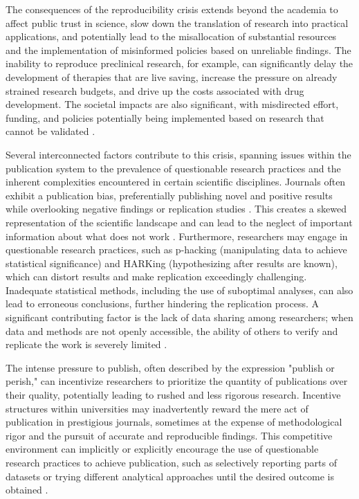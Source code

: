 \documentclass{article}
\begin{document}
The consequences of the reproducibility crisis extends beyond the academia to affect public trust in science, slow down the translation of research into practical applications, and potentially lead to the misallocation of substantial resources and the implementation of misinformed policies based on unreliable findings. The inability to reproduce preclinical research, for example, can significantly delay the development of therapies that are live saving, increase the pressure on already strained research budgets, and drive up the costs associated with drug development. The societal impacts are also significant, with misdirected effort, funding, and policies potentially being implemented based on research that cannot be validated \cite{freedman2015economics}.

Several interconnected factors contribute to this crisis, spanning issues within the publication system to the prevalence of questionable research practices and the inherent complexities encountered in certain scientific disciplines. Journals often exhibit a publication bias, preferentially publishing novel and positive results while overlooking negative findings or replication studies \cite{ioannidis2005most}. This creates a skewed representation of the scientific landscape and can lead to the neglect of important information about what does not work \cite{collins_policy_2014}. Furthermore, researchers may engage in questionable research practices, such as p-hacking (manipulating data to achieve statistical significance) and HARKing (hypothesizing after results are known), which can distort results and make replication exceedingly challenging. Inadequate statistical methods, including the use of suboptimal analyses, can also lead to erroneous conclusions, further hindering the replication process. A significant contributing factor is the lack of data sharing among researchers; when data and methods are not openly accessible, the ability of others to verify and replicate the work is severely limited \cite{munafo_manifesto_2017}.

The intense pressure to publish, often described by the expression "publish or perish," can incentivize researchers to prioritize the quantity of publications over their quality, potentially leading to rushed and less rigorous research. Incentive structures within universities may inadvertently reward the mere act of publication in prestigious journals, sometimes at the expense of methodological rigor and the pursuit of accurate and reproducible findings. This competitive environment can implicitly or explicitly encourage the use of questionable research practices to achieve publication, such as selectively reporting parts of datasets or trying different analytical approaches until the desired outcome is obtained \cite{david_robert_grimes_modelling_2018}.
\end{document}
